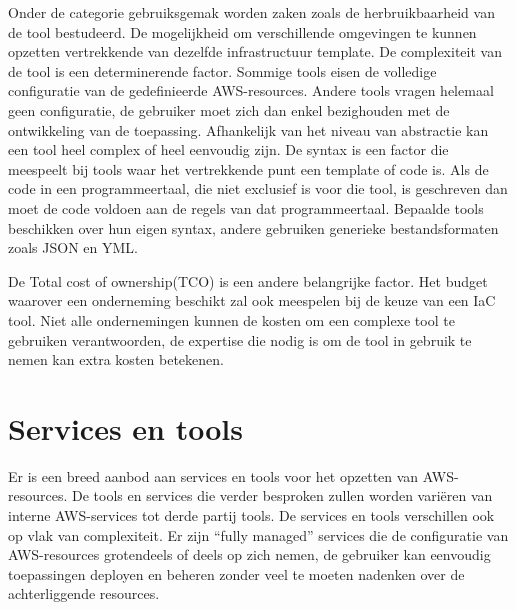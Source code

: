 Onder de categorie gebruiksgemak worden zaken zoals de herbruikbaarheid van de tool bestudeerd.
De mogelijkheid om verschillende omgevingen te kunnen opzetten vertrekkende van dezelfde infrastructuur template.
De complexiteit van de tool is een determinerende factor.
Sommige tools eisen de volledige configuratie van de gedefinieerde AWS-resources.
Andere tools vragen helemaal geen configuratie, de gebruiker moet zich dan enkel bezighouden met de ontwikkeling van de toepassing.
Afhankelijk van het niveau van abstractie kan een tool heel complex of heel eenvoudig zijn.
De syntax is een factor die meespeelt bij tools waar het vertrekkende punt een template of code is.
Als de code in een programmeertaal, die niet exclusief is voor die tool, is geschreven dan moet de code voldoen aan de regels van dat programmeertaal.
Bepaalde tools beschikken over hun eigen syntax, andere gebruiken generieke bestandsformaten zoals JSON en YML.

De Total cost of ownership(TCO) is een andere belangrijke factor.
Het budget waarover een onderneming beschikt zal ook meespelen bij de keuze van een IaC tool.
Niet alle ondernemingen kunnen de kosten om een complexe tool te gebruiken verantwoorden, de expertise die nodig is om de tool in gebruik te nemen kan extra kosten betekenen.

\section{Services en tools}
\label{sec:services-tools}

Er is een breed aanbod aan services en tools voor het opzetten van AWS-resources.
De tools en services die verder besproken zullen worden variëren van interne AWS-services tot derde partij tools.
De services en tools verschillen ook op vlak van complexiteit.
Er zijn “fully managed” services die de configuratie van AWS-resources grotendeels of deels op zich nemen, de gebruiker
kan eenvoudig toepassingen deployen en beheren zonder veel te moeten nadenken over de achterliggende resources.

